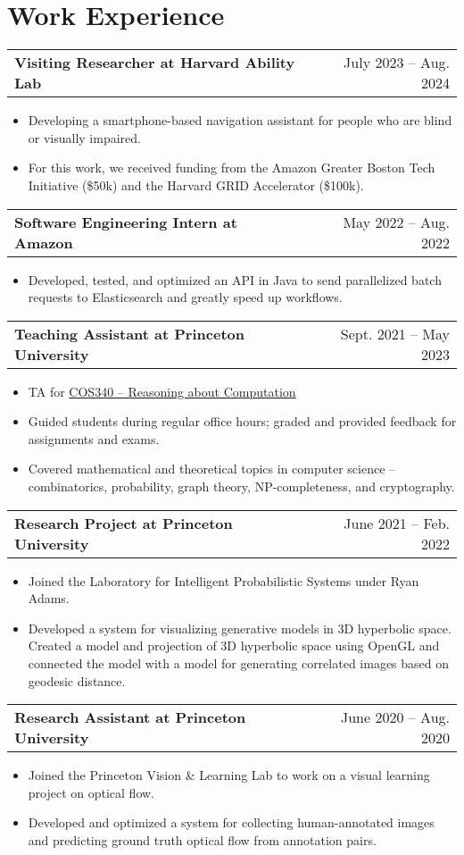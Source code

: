 \documentclass[a4paper,12pt]{article}
\makeatletter
\newenvironment{joblong}[2]
    {
    \begin{tabularx}{\linewidth}{@{}l X r@{}}
    \textbf{#1} & \hfill &  #2 \\[3.75pt]
    \end{tabularx}
    \begin{minipage}[t]{\linewidth}
    \begin{itemize}[nosep,after=\strut, leftmargin=2em, itemsep=3pt,label=--]
    }
    {
    \end{itemize}
    \end{minipage}    
    }
\makeatother
\begin{document}
\section{Work Experience}
\begin{adjustwidth}{0.7em}{0pt}

\begin{joblong}{Visiting Researcher at Harvard Ability Lab}{July 2023 – Aug. 2024}
\item Developing a smartphone-based navigation assistant for people who are blind or visually impaired.
\item For this work, we received funding from the Amazon Greater Boston Tech Initiative (\$50k) and the Harvard GRID Accelerator (\$100k).
\end{joblong}

\begin{joblong}{Software Engineering Intern at Amazon}{May 2022 – Aug. 2022}
\item Developed, tested, and optimized an API in Java to send parallelized batch requests to Elasticsearch and greatly speed up workflows.
\end{joblong}

\begin{joblong}{Teaching Assistant at Princeton University}{Sept. 2021 – May 2023}
\item TA for \href{https://www.cs.princeton.edu/courses/archive/fall21/cos340/}{COS340 – Reasoning about Computation}
\item Guided students during regular office hours; graded and provided feedback for assignments and exams.
\item Covered mathematical and theoretical topics in computer science – combinatorics, probability, graph theory, NP-completeness, and cryptography.
\end{joblong}

\begin{joblong}{Research Project at Princeton University}{June 2021 – Feb. 2022}
\item Joined the Laboratory for Intelligent Probabilistic Systems under Ryan Adams.
\item Developed a system for visualizing generative models in 3D hyperbolic space. Created a model and projection of 3D hyperbolic space using OpenGL and connected the model with a model for generating correlated images based on geodesic distance.
\end{joblong}

\begin{joblong}{Research Assistant at Princeton University}{June 2020 – Aug. 2020}
\item Joined the Princeton Vision \& Learning Lab to work on a visual learning project on optical flow.
\item Developed and optimized a system for collecting human-annotated images and predicting ground truth optical flow from annotation pairs.
\end{joblong}


\end{adjustwidth}
\end{document}
